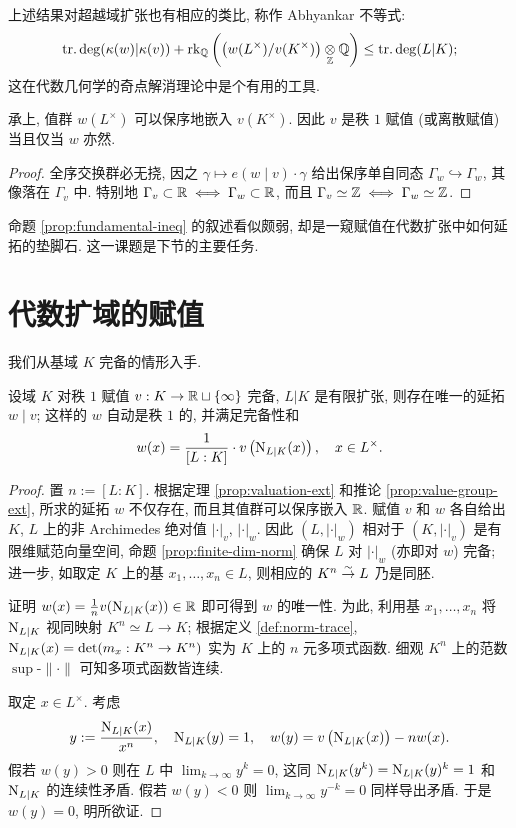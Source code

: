 上述结果对超越域扩张也有相应的类比, 称作 Abhyankar 不等式:
\[ \operatorname{tr.deg}(\kappa(w)|\kappa(v)) + \operatorname{rk}_{\mathbb{Q}}\left( \left(w(L^\times) / v(K^\times)\right) \underset{\mathbb{Z}}{\otimes} \mathbb{Q} \right) \leq \operatorname{tr.deg}(L|K); \]
这在代数几何学的奇点解消理论中是个有用的工具.

\begin{corollary}\label{prop:value-group-ext}
	承上, 值群 $w(L^\times)$ 可以保序地嵌入 $v(K^\times)$. 因此 $v$ 是秩 $1$ 赋值 (或离散赋值) 当且仅当 $w$ 亦然.
\end{corollary}
\begin{proof}
	全序交换群必无挠, 因之 $\gamma \mapsto e(w \mid v) \cdot \gamma$ 给出保序单自同态 $\Gamma_w \hookrightarrow \Gamma_w$, 其像落在 $\Gamma_v$ 中. 特别地 $\Gamma_v \subset \mathbb{R} \iff \Gamma_w \subset \mathbb{R}$, 而且 $\Gamma_v \simeq \mathbb{Z} \iff \Gamma_w \simeq \mathbb{Z}$.
\end{proof}

命题 \ref{prop:fundamental-ineq} 的叙述看似颇弱, 却是一窥赋值在代数扩张中如何延拓的垫脚石. 这一课题是下节的主要任务.

\section{代数扩域的赋值}\label{sec:valuation-ext-2}
我们从基域 $K$ 完备的情形入手.

\begin{theorem}\label{prop:valuation-ext-complete}
	设域 $K$ 对秩 $1$ 赋值 $v: K \to \mathbb{R} \sqcup \{\infty\}$ 完备, $L|K$ 是有限扩张, 则存在唯一的延拓 $w \mid v$; 这样的 $w$ 自动是秩 $1$ 的, 并满足完备性和
	\[ w(x) = \frac{1}{[L:K]} \cdot v\left(\operatorname{N}_{L|K}(x)\right), \quad x \in L^\times. \]
\end{theorem}
\begin{proof}
	置 $n := [L:K]$. 根据定理 \ref{prop:valuation-ext} 和推论 \ref{prop:value-group-ext}, 所求的延拓 $w$ 不仅存在, 而且其值群可以保序嵌入 $\mathbb{R}$. 赋值 $v$ 和 $w$ 各自给出 $K$, $L$ 上的非 Archimedes 绝对值 $|\cdot|_v$, $|\cdot|_w$. 因此 $(L, |\cdot|_w)$ 相对于 $(K, |\cdot|_v)$ 是有限维赋范向量空间, 命题 \ref{prop:finite-dim-norm} 确保 $L$ 对 $|\cdot|_w$ (亦即对 $w$) 完备; 进一步, 如取定 $K$ 上的基 $x_1, \ldots, x_n \in L$, 则相应的 $K^n \stackrel{\sim}{\rightarrow} L$ 乃是同胚.

	证明 $w(x) = \frac{1}{n} v(\operatorname{N}_{L|K}(x)) \in \mathbb{R}$ 即可得到 $w$ 的唯一性. 为此, 利用基 $x_1, \ldots, x_n$ 将 $\operatorname{N}_{L|K}$ 视同映射 $K^n \simeq L \to K$; 根据定义 \ref{def:norm-trace}, $\operatorname{N}_{L|K}(x) = \det(m_x: K^n \to K^n)$ 实为 $K$ 上的 $n$ 元多项式函数. 细观 $K^n$ 上的范数 $\sup\text{-}\|\cdot\|$ 可知多项式函数皆连续.
	
	取定 $x \in L^\times$. 考虑
	\[ y := \frac{\operatorname{N}_{L|K}(x)}{x^n}, \quad \operatorname{N}_{L|K}(y)=1, \quad w(y) = v \left( \operatorname{N}_{L|K}(x) \right) - n w(x). \]
	假若 $w(y) > 0$ 则在 $L$ 中 $\lim_{k \to \infty} y^k = 0$, 这同 $\operatorname{N}_{L|K}(y^k) = \operatorname{N}_{L|K}(y)^k = 1$ 和 $\operatorname{N}_{L|K}$ 的连续性矛盾. 假若 $w(y) < 0$ 则 $\lim_{k \to \infty} y^{-k} = 0$ 同样导出矛盾. 于是 $w(y)=0$, 明所欲证.
\end{proof}

